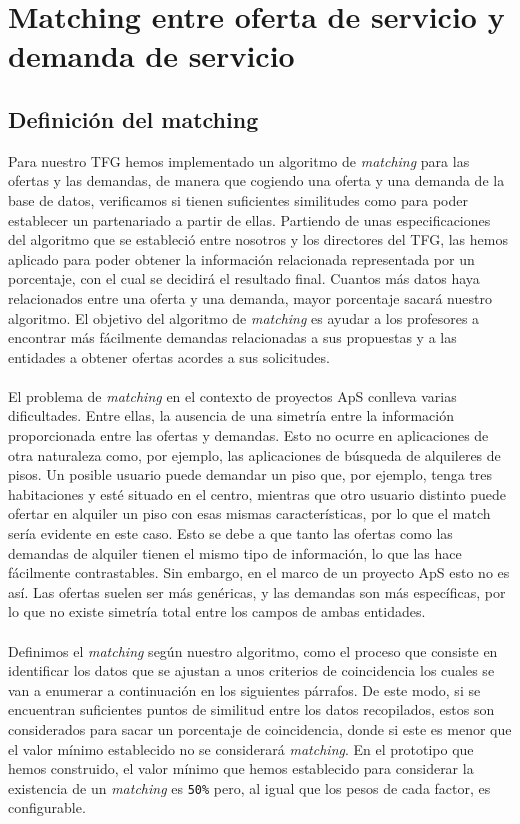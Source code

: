 \documentclass[11pt]{book}
\begin{document}
\chapter{Matching entre oferta de servicio y demanda de servicio}\label{cap:matching}
\section{Definición del matching }
Para nuestro TFG hemos implementado un algoritmo de \emph{matching} para las ofertas y las demandas, de manera que cogiendo una oferta y una demanda de la base de datos, verificamos si tienen suficientes similitudes como para poder establecer un partenariado a partir de ellas. Partiendo de unas especificaciones del algoritmo que se estableció entre nosotros y los directores del TFG, las hemos aplicado para poder obtener la información relacionada representada por un porcentaje, con el cual se decidirá el resultado final.  Cuantos más datos haya relacionados entre una oferta y una demanda, mayor porcentaje sacará nuestro algoritmo. El objetivo del algoritmo de \emph{matching} es ayudar a los profesores a encontrar más fácilmente demandas relacionadas a sus propuestas y a las entidades a obtener ofertas acordes a sus solicitudes. \\\\
El problema de \emph{matching} en el contexto de proyectos ApS conlleva varias dificultades. Entre ellas, la ausencia de una simetría entre la información proporcionada entre las ofertas y demandas. Esto no ocurre en aplicaciones de otra naturaleza como, por ejemplo, las aplicaciones de búsqueda de alquileres de pisos. Un posible usuario puede demandar un piso que, por ejemplo, tenga tres habitaciones y esté situado en el centro, mientras que otro usuario distinto puede ofertar en alquiler un piso con esas mismas características, por lo que el match sería evidente en este caso. Esto se debe a que tanto las ofertas como las demandas de alquiler tienen el mismo tipo de información, lo que las hace fácilmente contrastables. Sin embargo, en el marco de un proyecto ApS esto no es así. Las ofertas suelen ser más genéricas, y las demandas son más específicas, por lo que no existe simetría total entre los campos de ambas entidades.\\\\
Definimos el \emph{matching} según nuestro algoritmo, como el proceso que consiste en identificar los datos que se ajustan a unos criterios de coincidencia los cuales se van a enumerar a continuación en los siguientes párrafos. De este modo, si se encuentran suficientes puntos de similitud entre los datos recopilados, estos son considerados para sacar un porcentaje de coincidencia, donde si este es menor que el valor mínimo establecido no se considerará \emph{matching}. En el prototipo que hemos construido, el valor mínimo que hemos
establecido para considerar la existencia de un \emph{matching} es \texttt{50\%} pero, al
igual que los pesos de cada factor, es configurable.
\\\\
\end{document}
